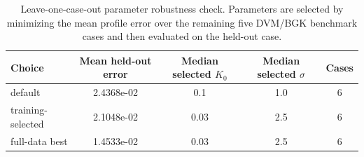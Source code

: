 \begin{table}[t]
\centering
\caption{Leave-one-case-out parameter robustness check. Parameters are selected by minimizing the mean profile error over the remaining five DVM/BGK benchmark cases and then evaluated on the held-out case.}
\label{tab:holdout_cv}
\begin{tabular}{lcccc}
\toprule
Choice & Mean held-out error & Median selected $K_0$ & Median selected $\sigma$ & Cases \\
\midrule
default & 2.4368e-02 & 0.1 & 1.0 & 6 \\
training-selected & 2.1048e-02 & 0.03 & 2.5 & 6 \\
full-data best & 1.4533e-02 & 0.03 & 2.5 & 6 \\
\bottomrule
\end{tabular}
\end{table}
